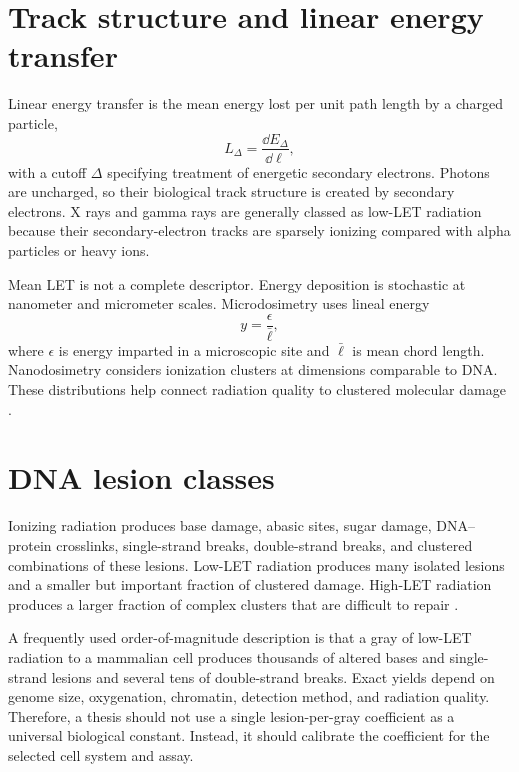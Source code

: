 \section{Track structure and linear energy transfer}

Linear energy transfer is the mean energy lost per unit path length by a charged particle,
\begin{equation}
L_\Delta=\frac{\dd E_\Delta}{\dd \ell},
\end{equation}
with a cutoff $\Delta$ specifying treatment of energetic secondary electrons. Photons are uncharged, so their biological track structure is created by secondary electrons. X rays and gamma rays are generally classed as low-LET radiation because their secondary-electron tracks are sparsely ionizing compared with alpha particles or heavy ions.

Mean LET is not a complete descriptor. Energy deposition is stochastic at nanometer and micrometer scales. Microdosimetry uses lineal energy
\begin{equation}
y=\frac{\epsilon}{\bar\ell},
\end{equation}
where $\epsilon$ is energy imparted in a microscopic site and $\bar\ell$ is mean chord length. Nanodosimetry considers ionization clusters at dimensions comparable to DNA. These distributions help connect radiation quality to clustered molecular damage \cite{kellerer1978,hawkins1996,goodhead1994}.

\section{DNA lesion classes}

Ionizing radiation produces base damage, abasic sites, sugar damage, DNA--protein crosslinks, single-strand breaks, double-strand breaks, and clustered combinations of these lesions. Low-LET radiation produces many isolated lesions and a smaller but important fraction of clustered damage. High-LET radiation produces a larger fraction of complex clusters that are difficult to repair \cite{ward1988,goodhead1994,sutherland2000,olive1998}.

A frequently used order-of-magnitude description is that a gray of low-LET radiation to a mammalian cell produces thousands of altered bases and single-strand lesions and several tens of double-strand breaks. Exact yields depend on genome size, oxygenation, chromatin, detection method, and radiation quality. Therefore, a thesis should not use a single lesion-per-gray coefficient as a universal biological constant. Instead, it should calibrate the coefficient for the selected cell system and assay.

